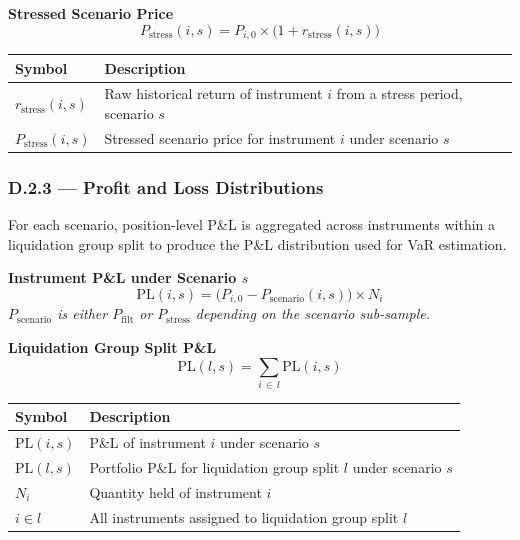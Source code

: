\documentclass[9pt, a4paper]{extarticle}
\newenvironment{formulabox}{\par\addvspace{4pt}}{\par\addvspace{4pt}}
\newcommand{\vartableheader}{%
    \textbf{Symbol} & \textbf{Description}\\
}
\begin{document}
\begin{formulabox}
\textbf{Stressed Scenario Price}
\begin{equation*}
    P_{\mathrm{stress}}(i,s)
        = P_{i,0} \times \bigl(1 + r_{\mathrm{stress}}(i,s)\bigr)
\end{equation*}
\end{formulabox}

\begin{tabularx}{\linewidth}{lX}
\toprule
\vartableheader
\midrule
$r_{\mathrm{stress}}(i,s)$  & Raw historical return of instrument $i$ from a stress period, scenario $s$ \\
$P_{\mathrm{stress}}(i,s)$  & Stressed scenario price for instrument $i$ under scenario $s$ \\
\bottomrule
\end{tabularx}

\subsubsection{D.2.3 — Profit and Loss Distributions}

For each scenario, position-level P\&L is aggregated across instruments within
a liquidation group split to produce the P\&L distribution used for VaR estimation.

\begin{formulabox}
\textbf{Instrument P\&L under Scenario $s$}
\begin{equation*}
    \mathrm{PL}(i,s) =
        \bigl(P_{i,0} - P_{\mathrm{scenario}}(i,s)\bigr) \times N_i
\end{equation*}
\textit{$P_{\mathrm{scenario}}$ is either $P_{\mathrm{filt}}$ or $P_{\mathrm{stress}}$
depending on the scenario sub-sample.}
\end{formulabox}

\begin{formulabox}
\textbf{Liquidation Group Split P\&L}
\begin{equation*}
    \mathrm{PL}(l,s) = \sum_{i \,\in\, l} \mathrm{PL}(i,s)
\end{equation*}
\end{formulabox}

\begin{tabularx}{\linewidth}{lX}
\toprule
\vartableheader
\midrule
$\mathrm{PL}(i,s)$  & P\&L of instrument $i$ under scenario $s$ \\
$\mathrm{PL}(l,s)$  & Portfolio P\&L for liquidation group split $l$ under scenario $s$ \\
$N_i$               & Quantity held of instrument $i$ \\
$i \in l$           & All instruments assigned to liquidation group split $l$ \\
\bottomrule
\end{tabularx}
\end{document}
